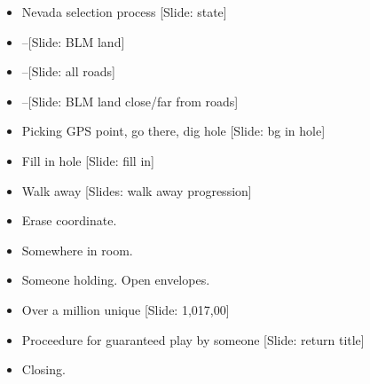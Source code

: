 \documentclass[12pt]{article}
\begin{document}
{\begin{itemize}
\item Nevada selection process [Slide: state]
\item --[Slide: BLM land]
\item --[Slide: all roads]
\item --[Slide: BLM land close/far from roads]

\item Picking GPS point, go there, dig hole [Slide: bg in hole]

\item Fill in hole [Slide: fill in]

\item Walk away [Slides:  walk away progression]

\item Erase coordinate.

\item Somewhere in room.

\item Someone holding. Open envelopes.

\item Over a million unique [Slide: 1,017,00]

\item Proceedure for guaranteed play by someone [Slide: return title]

\item Closing.


\end{itemize}

}
\end{document}
